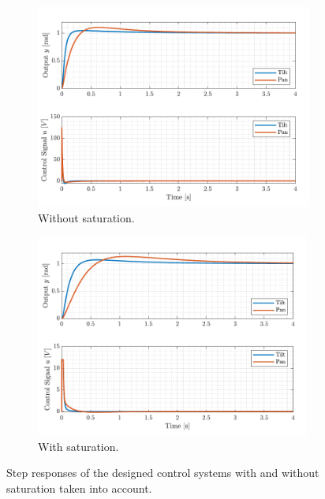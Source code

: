 \documentclass[../../main.tex]{subfiles}
\begin{document}
\begin{figure}[h]
\begin{subfigure}{0.50\textwidth}
    \includegraphics[width=0.99 \textwidth]{Sections/System_Design/Images/PoscontrollerWithoutSaturation.pdf}
    \caption{Without saturation.}
    \label{fig:PosStepSat}
\end{subfigure}\hfill
\begin{subfigure}{0.50\textwidth}
    \includegraphics[width=0.99\textwidth]{Sections/System_Design/Images/PoscontrollerWithSaturation.pdf}
    \caption{With saturation.}
    \label{fig:PosStepNoSat}
\end{subfigure}
\caption{Step responses of the designed control systems with and without saturation taken into account.}
\label{fig:PosStep}
\end{figure}
\end{document}

